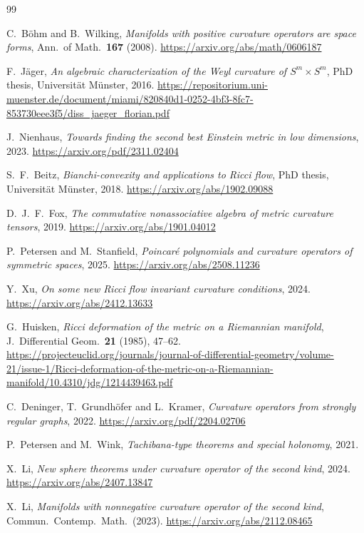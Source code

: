 \begin{thebibliography}{99}

 C.~B\"ohm and B.~Wilking,
\emph{Manifolds with positive curvature operators are space forms},
Ann.\ of Math.\ \textbf{167} (2008).
\url{https://arxiv.org/abs/math/0606187}

 F.~J\"ager,
\emph{An algebraic characterization of the Weyl curvature of $S^m\times S^m$},
PhD thesis, Universit\"at M\"unster, 2016.
\url{https://repositorium.uni-muenster.de/document/miami/820840d1-0252-4bf3-8fc7-853730eee3f5/diss_jaeger_florian.pdf}

 J.~Nienhaus,
\emph{Towards finding the second best Einstein metric in low dimensions}, 2023.
\url{https://arxiv.org/pdf/2311.02404}

 S.~F.~Beitz,
\emph{Bianchi-convexity and applications to Ricci flow},
PhD thesis, Universit\"at M\"unster, 2018.
\url{https://arxiv.org/abs/1902.09088}

 D.~J.~F.~Fox,
\emph{The commutative nonassociative algebra of metric curvature tensors}, 2019.
\url{https://arxiv.org/abs/1901.04012}

 P.~Petersen and M.~Stanfield,
\emph{Poincar\'e polynomials and curvature operators of symmetric spaces}, 2025.
\url{https://arxiv.org/abs/2508.11236}

 Y.~Xu,
\emph{On some new Ricci flow invariant curvature conditions}, 2024.
\url{https://arxiv.org/abs/2412.13633}

 G.~Huisken,
\emph{Ricci deformation of the metric on a Riemannian manifold},
J.\ Differential Geom.\ \textbf{21} (1985), 47--62.
\url{https://projecteuclid.org/journals/journal-of-differential-geometry/volume-21/issue-1/Ricci-deformation-of-the-metric-on-a-Riemannian-manifold/10.4310/jdg/1214439463.pdf}

 C.~Deninger, T.~Grundh\"ofer and L.~Kramer,
\emph{Curvature operators from strongly regular graphs}, 2022.
\url{https://arxiv.org/pdf/2204.02706}

 P.~Petersen and M.~Wink,
\emph{Tachibana-type theorems and special holonomy}, 2021.

 X.~Li,
\emph{New sphere theorems under curvature operator of the second kind}, 2024.
\url{https://arxiv.org/abs/2407.13847}

 X.~Li,
\emph{Manifolds with nonnegative curvature operator of the second kind},
Commun.\ Contemp.\ Math.\ (2023).
\url{https://arxiv.org/abs/2112.08465}


\end{thebibliography}
